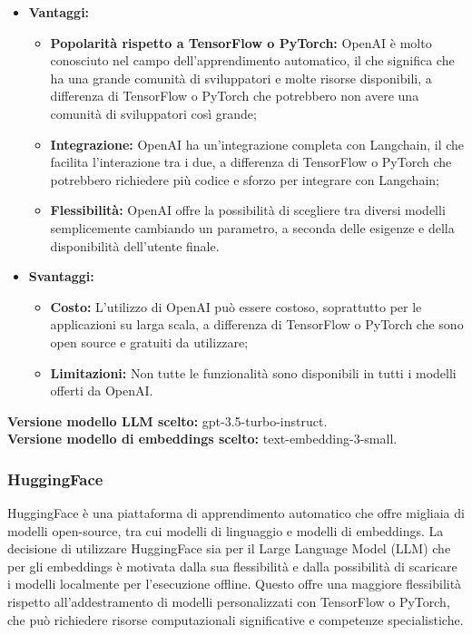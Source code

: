 \documentclass[10pt, a4paper]{article}
\begin{document}
\begin{itemize}
\item \textbf{Vantaggi:}
\begin{itemize}
\item \textbf{Popolarità rispetto a TensorFlow o PyTorch:} OpenAI è molto conosciuto nel campo dell'apprendimento automatico, il che significa che ha una grande comunità di sviluppatori e molte risorse disponibili, a differenza di TensorFlow o PyTorch che potrebbero non avere una comunità di sviluppatori così grande;
\item \textbf{Integrazione:} OpenAI ha un'integrazione completa con Langchain, il che facilita l'interazione tra i due, a differenza di TensorFlow o PyTorch che potrebbero richiedere più codice e sforzo per integrare con Langchain;
\item \textbf{Flessibilità:} OpenAI offre la possibilità di scegliere tra diversi modelli semplicemente cambiando un parametro, a seconda delle esigenze e della disponibilità dell'utente finale.
\end{itemize}
\item \textbf{Svantaggi:}
\begin{itemize}
\item \textbf{Costo:} L'utilizzo di OpenAI può essere costoso, soprattutto per le applicazioni su larga scala, a differenza di TensorFlow o PyTorch che sono open source e gratuiti da utilizzare;
\item \textbf{Limitazioni:} Non tutte le funzionalità sono disponibili in tutti i modelli offerti da OpenAI.
\end{itemize}
\end{itemize}
\textbf{Versione modello LLM scelto:} gpt-3.5-turbo-instruct. \\
\textbf{Versione modello di embeddings scelto:} text-embedding-3-small.

\subsubsection{HuggingFace}
HuggingFace è una piattaforma di apprendimento automatico che offre migliaia di modelli open-source, tra cui modelli di linguaggio e modelli di embeddings. La decisione di utilizzare HuggingFace sia per il Large Language Model (LLM) che per gli embeddings è motivata dalla sua flessibilità e dalla possibilità di scaricare i modelli localmente per l’esecuzione offline. Questo offre una maggiore flessibilità rispetto all’addestramento di modelli personalizzati con TensorFlow o PyTorch, che può richiedere risorse computazionali significative e competenze specialistiche.
\end{document}
